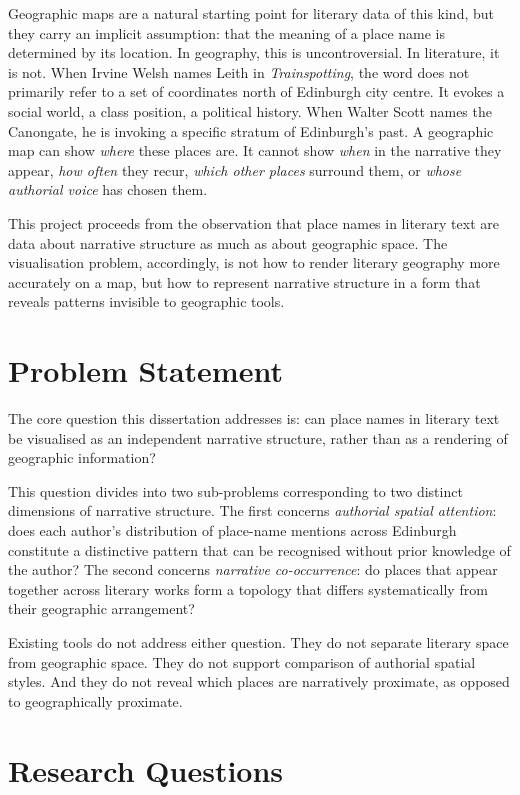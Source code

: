 \documentclass[logo,msc]{infthesis}
\begin{document}
Geographic maps are a natural starting point for literary data of this kind, but they carry an implicit assumption: that the meaning of a place name is determined by its location. In geography, this is uncontroversial. In literature, it is not. When Irvine Welsh names Leith in \textit{Trainspotting}, the word does not primarily refer to a set of coordinates north of Edinburgh city centre. It evokes a social world, a class position, a political history. When Walter Scott names the Canongate, he is invoking a specific stratum of Edinburgh's past. A geographic map can show \emph{where} these places are. It cannot show \emph{when} in the narrative they appear, \emph{how often} they recur, \emph{which other places} surround them, or \emph{whose authorial voice} has chosen them.
 
This project proceeds from the observation that place names in literary text are data about narrative structure as much as about geographic space. The visualisation problem, accordingly, is not how to render literary geography more accurately on a map, but how to represent narrative structure in a form that reveals patterns invisible to geographic tools.
 
\section{Problem Statement}
 
The core question this dissertation addresses is: can place names in literary text be visualised as an independent narrative structure, rather than as a rendering of geographic information?
 
This question divides into two sub-problems corresponding to two distinct dimensions of narrative structure. The first concerns \emph{authorial spatial attention}: does each author's distribution of place-name mentions across Edinburgh constitute a distinctive pattern that can be recognised without prior knowledge of the author? The second concerns \emph{narrative co-occurrence}: do places that appear together across literary works form a topology that differs systematically from their geographic arrangement?
 
Existing tools do not address either question. They do not separate literary space from geographic space. They do not support comparison of authorial spatial styles. And they do not reveal which places are narratively proximate, as opposed to geographically proximate.
 
\section{Research Questions}
 
\end{document}
